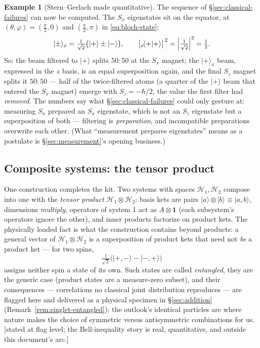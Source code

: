 \documentclass[11pt]{article}
\theoremstyle{plain}
\theoremstyle{definition}
\newtheorem{example}[theorem]{Example}
\theoremstyle{remark}
\newcommand{\idop}{\mathbf{1}}  %
\newcommand{\ket}[1]{\lvert #1 \rangle}
\newcommand{\braket}[2]{\langle #1 | #2 \rangle}
\begin{document}
\begin{example}[Stern--Gerlach made quantitative]\label{ex:SG-quant}
The sequence of \S\ref{sec:classical-failures} can now be computed.
The $S_x$ eigenstates sit on the equator, at
$(\theta, \varphi) = (\tfrac\pi2, 0)$ and $(\tfrac\pi2, \pi)$ in
\eqref{eq:bloch-state}:
\begin{equation}
  \ket\pm_x = \tfrac{1}{\sqrt2}\bigl(\ket+ \pm \ket-\bigr),
  \qquad
  \bigl|{}_x\!\braket{+}{+}\bigr|^{\,2}
  = \Bigl|\tfrac{1}{\sqrt2}\Bigr|^2 = \tfrac12 .
\end{equation}
So: the beam filtered to $\ket+$ splits $50{:}50$ at the $S_x$
magnet; the $\ket+_x$ beam, expressed in the $z$ basis, is an equal
superposition again, and the final $S_z$ magnet splits it
$50{:}50$ --- half of the twice-filtered atoms (a quarter of the
$\ket+$ beam that entered the $S_x$ magnet) emerge with
$S_z = -\hbar/2$, the value the first filter had \emph{removed}. The
numbers say what \S\ref{sec:classical-failures} could only gesture
at: measuring $S_x$ prepared an $S_x$ eigenstate, which is not an
$S_z$ eigenstate but a superposition of both --- filtering is
\emph{preparation}, and incompatible preparations overwrite each
other. (What ``measurement prepares eigenstates'' means as a
postulate is \S\ref{sec:measurement}'s opening business.)
\end{example}

\subsection{Composite systems: the tensor product}
\label{sec:tensor-product}

One construction completes the kit. Two systems with spaces
$\mathcal H_1, \mathcal H_2$ compose into one with the \emph{tensor
product} $\mathcal H_1 \otimes \mathcal H_2$: basis kets are pairs
$\ket{a}\otimes\ket{b} \equiv \ket{a, b}$, dimensions
\emph{multiply}, operators of system 1 act as $A \otimes \idop$
(each subsystem's operators ignore the other), and inner products
factorize on product kets. The physically loaded fact is what the
construction contains beyond products: a general vector of
$\mathcal H_1 \otimes \mathcal H_2$ is a superposition of product
kets that need not \emph{be} a product ket --- for two spins,
\begin{equation}
  \tfrac{1}{\sqrt2}\bigl(
    \ket{+,-} - \ket{-,+}
  \bigr)
\end{equation}
assigns neither spin a state of its own. Such states are called
\emph{entangled}, they are the generic case (product states are a
measure-zero subset), and their consequences --- correlations no
classical joint distribution reproduces --- are flagged here and
delivered as a physical specimen in \S\ref{sec:addition}
(Remark~\ref{rem:singlet-entangled}); the outlook's identical
particles are where nature makes the choice of symmetric versus
antisymmetric combinations for us. [stated at flag level; the Bell-inequality
story is real, quantitative, and outside this document's arc.]
\end{document}
